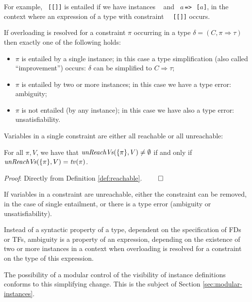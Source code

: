 For example, {\tt \Eq\ [[\Integer]]} is entailed if we have instances
{\tt \Eq\ \Integer} and {\tt \Eq\ $a\,$=>$\,$\Eq\ [$a$]}, in the
context where an expression of a type with constraint {\tt
  \Eq\ [[\Integer]]} occurs.

If overloading is resolved for a constraint $\pi$ occurring in a type
$\delta = (C,\pi \Rightarrow \tau)$ then exactly one of the following
holds:
\begin{itemize}

\item $\pi$ is entailed by a single instance; in this case a type
  simplification (also called ``improvement'') occurs: $\delta$ can be
  simplified to $C \Rightarrow \tau$;

\item $\pi$ is entailed by two or more instances; in this case we have
  a type error: ambiguity;

\item $\pi$ is not entailed (by any instance); in this case we have also
  a type error: unsatisfiability.

\end{itemize}

Variables in a single constraint are either all reachable or all
unreachable:

\begin{Lemma}
  \label{lemma:unreachable-means-all-unreachable}
  For all $\pi, V$, we have that $\text{\it unReachVs\/}(\{\pi\},V)\not=\emptyset$
  if and only if $\text{\it unReachVs\/}(\{\pi\},V)={\it tv\/}(\pi)$.
\end{Lemma}

{\em Proof\/}: Directly from Definition \ref{def:reachable}. $\qed$

If variables in a constraint are unreachable, either the constraint
can be removed, in the case of single entailment, or there is a type
error (ambiguity or unsatisfiability).

Instead of a syntactic property of a type, dependent on the
specification of FDs or TFs, ambiguity is a property of an expression,
depending on the existence of two or more instances in a context when
overloading is resolved for a constraint on the type of this
expression.

The possibility of a modular control of the visibility of instance
definitions conforms to this simplifying change. This is the subject
of Section \ref{sec:modular-instances}. 
